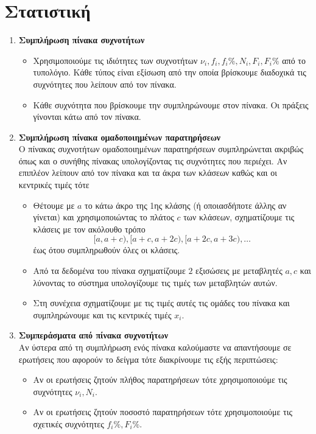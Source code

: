 \documentclass[a4paper,11pt]{article}
\begin{document}
\section{Στατιστική}
\begin{enumerate}[label=\bf\thesection.\arabic*.]
\item\textbf{Συμπλήρωση πίνακα συχνοτήτων}
\begin{itemize}
\item Χρησιμοποιούμε τις ιδιότητες των συχνοτήτων $\nu_i,f_i,f_i\%,N_i,F_i,F_i\%$ από το τυπολόγιο. Κάθε τύπος είναι εξίσωση από την οποία βρίσκουμε διαδοχικά τις συχνότητες που λείπουν από τον πίνακα.
\item Κάθε συχνότητα που βρίσκουμε την συμπληρώνουμε στον πίνακα. Οι πράξεις γίνονται κάτω από τον πίνακα.
\end{itemize}
\item \textbf{Συμπλήρωση πίνακα ομαδοποιημένων παρατηρήσεων}\\
Ο πίνακας συχνοτήτων ομαδοποιημένων παρατηρήσεων συμπληρώνεται ακριβώς όπως και ο συνήθης πίνακας υπολογίζοντας τις συχνότητες που περιέχει. Αν επιπλέον λείπουν από τον πίνακα και τα άκρα των κλάσεων καθώς και οι κεντρικές τιμές τότε
\begin{itemize}
\item Θέτουμε με $ a $ το κάτω άκρο της 1ης κλάσης (ή οποιασδήποτε άλλης αν γίνεται) και χρησιμοποιώντας το πλάτος $ c $ των κλάσεων, σχηματίζουμε τις κλάσεις με τον ακόλουθο τρόπο
\[ [a,a+c),[a+c,a+2c),[a+2c,a+3c),\ldots \]
έως ότου συμπληρωθούν όλες οι κλάσεις.
\item Από τα δεδομένα του πίνακα σχηματίζουμε $ 2 $ εξισώσεις με μεταβλητές $ a,c $ και λύνοντας το σύστημα υπολογίζουμε τις τιμές των μεταβλητών αυτών.
\item Στη συνέχεια σχηματίζουμε με τις τιμές αυτές τις ομάδες του πίνακα και συμπληρώνουμε και τις κεντρικές τιμές $ x_i $.
\end{itemize}
\item \textbf{Συμπεράσματα από πίνακα συχνοτήτων}\\
Αν ύστερα από τη συμπλήρωση ενός πίνακα καλούμαστε να απαντήσουμε σε ερωτήσεις που αφορούν το δείγμα τότε διακρίνουμε τις εξής περιπτώσεις:
\begin{itemize}
\item Αν οι ερωτήσεις ζητούν πλήθος παρατηρήσεων τότε χρησιμοποιούμε τις συχνότητες $ \nu_i,N_i $.
\item Αν οι ερωτήσεις ζητούν ποσοστό παρατηρήσεων τότε χρησιμοποιούμε τις σχετικές συχνότητες $ f_i\%,F_i\% $.

\end{itemize}
\end{enumerate}
\end{document}
